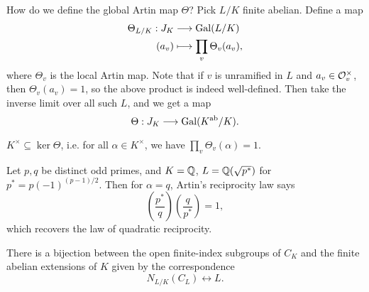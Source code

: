 \begin{remark}
  How do we define the global
  Artin map $\Theta$? Pick $L / K$ finite
  abelian. Define a map
  \begin{align*}
    \Theta_{L / K} : J_K
    &\longrightarrow \operatorname{Gal}(L / K) \\
    (a_v) &\longmapsto \prod_v \Theta_v(a_v),
  \end{align*}
  where $\Theta_v$ is the local Artin map.
  Note that if $v$ is
  unramified in $L$ and $a_v \in \mathcal{O}_v^\times$,
  then $\Theta_v(a_v) = 1$, so the
  above product is indeed well-defined. Then
  take the inverse limit over all such $L$,
  and we get a map
  \[
    \Theta : J_K \longrightarrow \operatorname{Gal}(K^\mathrm{ab} / K).
  \]
\end{remark}

\begin{theorem}
  $K^\times \subseteq \ker \Theta$, i.e.
  for all $\alpha \in K^\times$, we have
  $\prod_v \Theta_v(\alpha) = 1$.
\end{theorem}

\begin{example}
  Let $p, q$ be distinct odd primes, and
  $K = \mathbb{Q}$, $L = \mathbb{Q}(\sqrt{p^*})$ for
  $p^* = p (-1)^{(p - 1) / 2}$. Then for
  $\alpha = q$, Artin's reciprocity
  law says
  \[
    \left(\frac{p^*}{q}\right)
    \left(\frac{q}{p^*}\right) = 1,
  \]
  which recovers the law of quadratic
  reciprocity.
\end{example}

\begin{theorem}
  There is a bijection between the
  open finite-index subgroups of $C_K$
  and the finite abelian
  extensions of $K$
  given by the correspondence
  \[
    N_{L / K}(C_L) \longleftrightarrow L.
  \]
\end{theorem}
